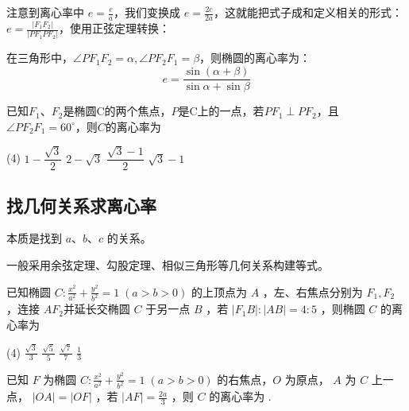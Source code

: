 \begin{theorem}
    注意到离心率中 $e = \frac{c}{a}$，我们变换成 $e = \frac{2c}{2a}$，这就能把式子成和定义相关的形式：$e = \frac{|F_1F_2|}{|PF_1 PF_2|}$，使用正弦定理转换：

    在三角形中，$\angle PF_1F_2 = \alpha, \angle PF_2F_1 = \beta$，则椭圆的离心率为：
    $$e = \frac{\sin(\alpha + \beta)}{\sin \alpha + \sin \beta}$$
\end{theorem}


\begin{example}
    已知$F_1$、$F_2$是椭圆C的两个焦点，$P$是C上的一点，若$P F_1 \perp P F_2$，且$\angle P F_2 F_1 = 60^\circ$，则$C$的离心率为
    \begin{tasks}(4)
        \task $ 1- \dfrac{\sqrt{3}}{2}$
        \task $2 - \sqrt{3}$
        \task $\dfrac{\sqrt{3} - 1}{2}$
        \task $\sqrt{3} - 1$
    \end{tasks}
\end{example}

\vspace{10em}

\subsection{找几何关系求离心率}

\begin{tips}
    本质是找到 $a$、$b$、$c$ 的关系。

    一般采用余弦定理、勾股定理、相似三角形等几何关系构建等式。
\end{tips}

\begin{example}
    已知椭圆 $C: \frac{x^{2}}{a^{2}}+\frac{y^{2}}{b^{2}}=1\;(a>b>0)$ 的上顶点为 $A$ ，左、右焦点分别为 $F_{1}, F_{2}$ ，连接 $A F_{2}$并延长交椭圆 $C$ 于另一点 $B$ ，若 $|F_{1} B|:|A B|=4:5$ ，则椭圆 $C$ 的离心率为
    \begin{tasks}(4)
        \task $\frac{\sqrt{3}}{3}$
        \task $\frac{\sqrt{5}}{5}$
        \task $\frac{\sqrt{7}}{7}$
        \task $\frac{1}{3}$
    \end{tasks}
\end{example}

\vspace{10em}

\begin{example}
    已知 $F$ 为椭圆 $C: \frac{x^{2}}{a^{2}}+\frac{y^{2}}{b^{2}}=1\;(a>b>0)$ 的右焦点，$O$ 为原点， $A$ 为 $C$ 上一点， $|OA|=|OF|$ ，若 $|AF|=\frac{2a}{3}$ ，则 $C$ 的离心率为 \underline{\hspace{3cm}}.
\end{example}

